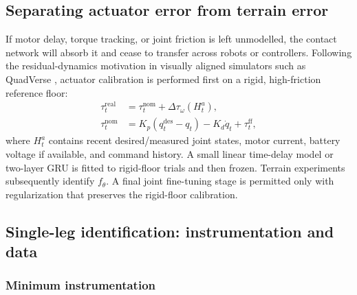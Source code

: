\subsection{Separating actuator error from terrain error}

If motor delay, torque tracking, or joint friction is left unmodelled, the contact network will absorb it and cease to transfer across robots or controllers. Following the residual-dynamics motivation in visually aligned simulators such as QuadVerse \citep{chen2026quadverse}, actuator calibration is performed first on a rigid, high-friction reference floor:
\begin{align}
\tau_t^{\mathrm{real}} &= \tau_t^{\mathrm{nom}}+\Delta\tau_\omega(H_t^a),\\
\tau_t^{\mathrm{nom}} &= K_p(q_t^{\mathrm{des}}-q_t)-K_d\dot q_t+\tau_t^{\mathrm{ff}},
\label{eq:actuator_residual}
\end{align}
where $H_t^a$ contains recent desired/measured joint states, motor current, battery voltage if available, and command history. A small linear time-delay model or two-layer GRU is fitted to rigid-floor trials and then frozen. Terrain experiments subsequently identify $f_\theta$. A final joint fine-tuning stage is permitted only with regularization that preserves the rigid-floor calibration.

\subsection{Single-leg identification: instrumentation and data}

\subsubsection{Minimum instrumentation}

